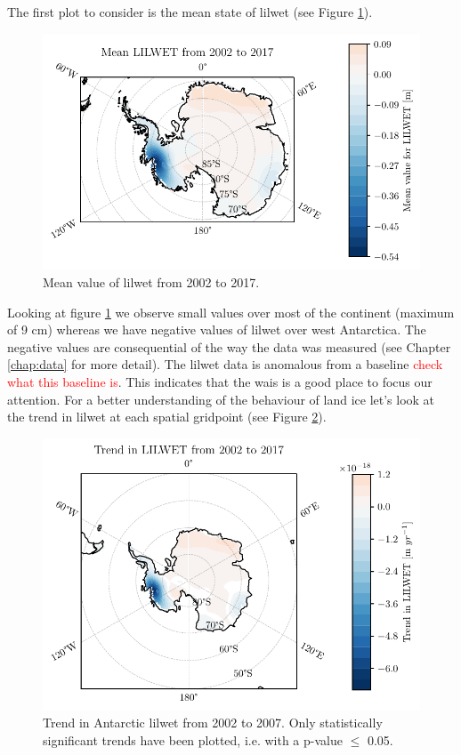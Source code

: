 \documentclass[../main.tex]{subfiles}
\begin{document}
The first plot to consider is the mean state of \gls{lilwet} (see Figure \ref{fig:lilwet_mean}).
 \begin{figure}[!hbt]
     \centering
     \includegraphics{images/2021w5/chapter7/hres/mean_spatial_LIC}
     \caption{Mean value of \gls{lilwet} from 2002 to 2017.}
     \label{fig:lilwet_mean}
 \end{figure}
 Looking at figure \ref{fig:lilwet_mean} we observe small values over most of the continent (maximum of 9 cm) whereas we have negative values of \gls{lilwet} over west Antarctica. The negative values are consequential of the way the data was measured (see Chapter \ref{chap:data} for more detail). The \gls{lilwet} data is anomalous from a baseline \textcolor{red}{check what this baseline is}. This indicates that the \gls{wais} is a good place to focus our attention. For a better understanding of the behaviour of land ice let's look at the trend in \gls{lilwet} at each spatial gridpoint (see Figure \ref{fig:lilwet_trend}).
\begin{figure}[!hbt]
    \centering
    \includegraphics{images/2021w5/chapter7/hres/trend_spatial_LIC}
    \caption{Trend in Antarctic \gls{lilwet} from 2002 to 2007. Only statistically significant trends have been plotted, i.e. with a p-value $\leq$ 0.05.}
    \label{fig:lilwet_trend}
\end{figure}
\end{document}
